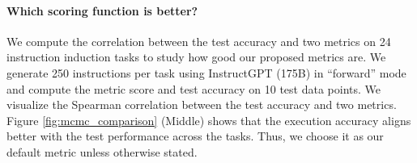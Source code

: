 \paragraph{Which scoring function is better?} We compute the correlation between the test accuracy and two metrics on 24 instruction induction tasks to study how good our proposed metrics are. We generate 250 instructions per task using InstructGPT (175B) in “forward” mode and compute the metric score and test accuracy on 10 test data points. We visualize the Spearman correlation between the test accuracy and two metrics. Figure \ref{fig:mcmc_comparison} (Middle) shows that the execution accuracy aligns better with the test performance across the tasks. Thus, we choose it as our default metric unless otherwise stated.


